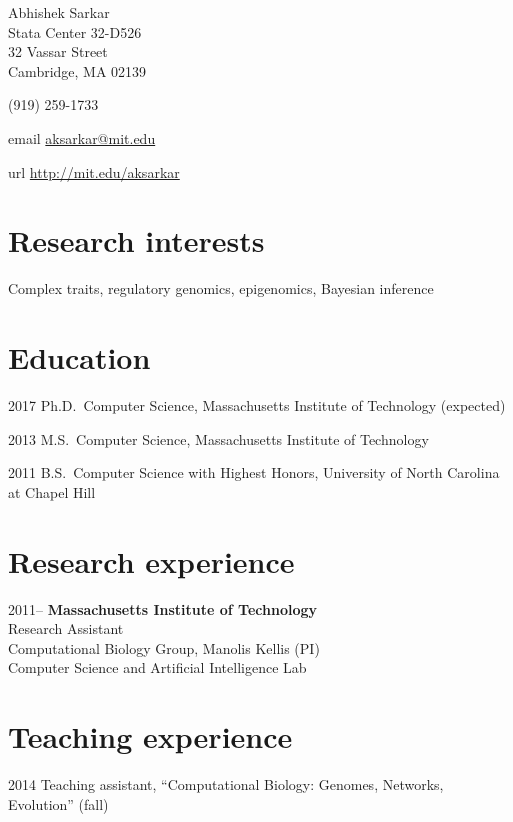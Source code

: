 \documentclass{article}
\begin{document}
{\LARGE Abhishek Sarkar\vspace{1em}}\\
Stata Center 32-D526\\
32 Vassar Street\\
Cambridge, MA 02139\vspace{1em}

(919) 259-1733

\begin{hdesc}
\item[email] \url{aksarkar@mit.edu}
\item[url] \url{http://mit.edu/aksarkar}
\end{hdesc}

\section*{Research interests}
Complex traits, regulatory genomics, epigenomics, Bayesian inference

\section*{Education}
\begin{hdesc}
\item[2017] Ph.D.\ Computer Science, Massachusetts Institute of Technology
  (expected)
\item[2013] M.S.\ Computer Science, Massachusetts Institute of Technology
\item[2011] B.S.\ Computer Science with Highest Honors, University of North
  Carolina at Chapel Hill
\end{hdesc}

\section*{Research experience}
\begin{hdesc}[itemsep=1em]
\item[2011--] \textbf{Massachusetts Institute of Technology}\\
Research Assistant\\
Computational Biology Group, Manolis Kellis (PI)\\
Computer Science and Artificial Intelligence Lab
\end{hdesc}

\section*{Teaching experience}
\begin{hdesc}[itemsep=1em]
\item[2014] Teaching assistant, ``Computational Biology: Genomes, Networks, Evolution'' (fall)
\end{hdesc}
\end{document}
